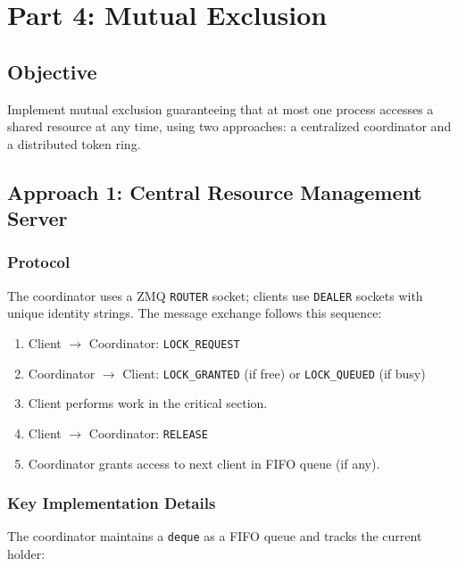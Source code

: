 \documentclass[12pt,a4paper]{article}
\begin{document}
\section{Part 4: Mutual Exclusion}

\subsection{Objective}

Implement mutual exclusion guaranteeing that at most one process accesses a shared resource at any time, using two approaches: a centralized coordinator and a distributed token ring.

\subsection{Approach 1: Central Resource Management Server}

\subsubsection{Protocol}

The coordinator uses a ZMQ \texttt{ROUTER} socket; clients use \texttt{DEALER} sockets with unique identity strings. The message exchange follows this sequence:

\begin{enumerate}
    \item Client $\rightarrow$ Coordinator: \texttt{LOCK\_REQUEST}
    \item Coordinator $\rightarrow$ Client: \texttt{LOCK\_GRANTED} (if free) or \texttt{LOCK\_QUEUED} (if busy)
    \item Client performs work in the critical section.
    \item Client $\rightarrow$ Coordinator: \texttt{RELEASE}
    \item Coordinator grants access to next client in FIFO queue (if any).
\end{enumerate}

\subsubsection{Key Implementation Details}

The coordinator maintains a \texttt{deque} as a FIFO queue and tracks the current holder:
\end{document}
